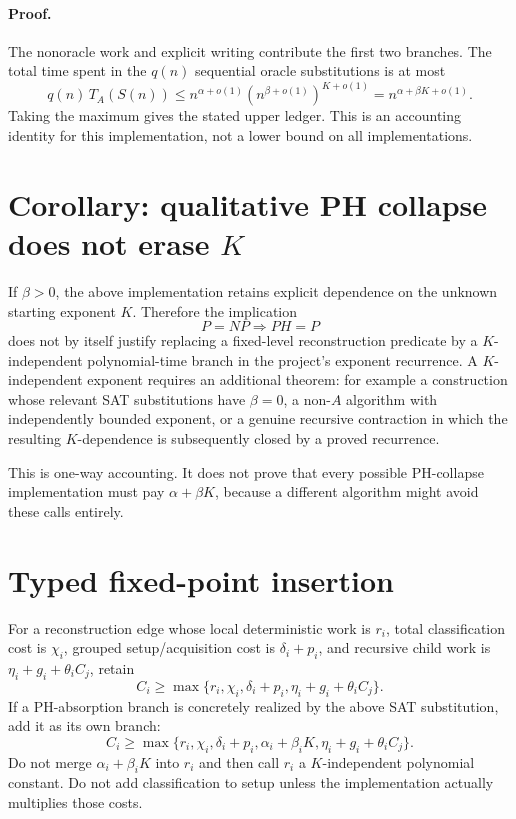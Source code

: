 \documentclass[11pt]{article}
\begin{document}
\paragraph{Proof.}
The nonoracle work and explicit writing contribute the first two branches. The total time spent in the \(q(n)\) sequential oracle substitutions is at most
\[
q(n)\,T_A(S(n))
\le
n^{\alpha+o(1)}
\left(n^{\beta+o(1)}\right)^{K+o(1)}
=
n^{\alpha+\beta K+o(1)}.
\]
Taking the maximum gives the stated upper ledger. This is an accounting identity for this implementation, not a lower bound on all implementations.

\section*{Corollary: qualitative PH collapse does not erase \(K\)}
If \(\beta>0\), the above implementation retains explicit dependence on the unknown starting exponent \(K\). Therefore the implication
\[
P=NP\Longrightarrow PH=P
\]
does not by itself justify replacing a fixed-level reconstruction predicate by a \(K\)-independent polynomial-time branch in the project's exponent recurrence. A \(K\)-independent exponent requires an additional theorem: for example a construction whose relevant SAT substitutions have \(\beta=0\), a non-\(A\) algorithm with independently bounded exponent, or a genuine recursive contraction in which the resulting \(K\)-dependence is subsequently closed by a proved recurrence.

This is one-way accounting. It does not prove that every possible PH-collapse implementation must pay \(\alpha+\beta K\), because a different algorithm might avoid these calls entirely.

\section*{Typed fixed-point insertion}
For a reconstruction edge whose local deterministic work is \(r_i\), total classification cost is \(\chi_i\), grouped setup/acquisition cost is \(\delta_i+p_i\), and recursive child work is \(\eta_i+g_i+\theta_i C_j\), retain
\[
C_i\ge
\max\{r_i,\chi_i,\delta_i+p_i,\eta_i+g_i+\theta_i C_j\}.
\]
If a PH-absorption branch is concretely realized by the above SAT substitution, add it as its own branch:
\[
C_i\ge
\max\{r_i,\chi_i,\delta_i+p_i,\alpha_i+\beta_iK,
\eta_i+g_i+\theta_iC_j\}.
\]
Do not merge \(\alpha_i+\beta_iK\) into \(r_i\) and then call \(r_i\) a \(K\)-independent polynomial constant. Do not add classification to setup unless the implementation actually multiplies those costs.
\end{document}
